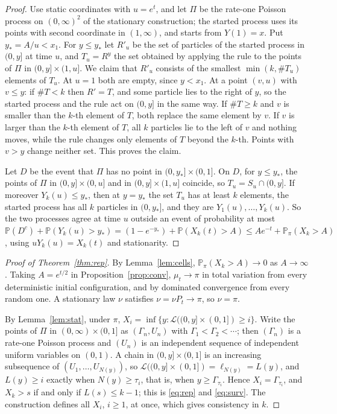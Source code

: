 \documentclass[11pt]{amsart}
\theoremstyle{remark}
\numberwithin{equation}{section}
\newcommand{\Pp}{\mathbb P}
\begin{document}
\begin{proof}
Use static coordinates with $u=e^t$, and let $\Pi$ be the rate-one Poisson process on $(0,\infty)^2$ of the stationary construction; the started process uses its points with second coordinate in $(1,\infty)$, and starts from $Y(1)=x$. Put $y_*=A/u<x_1$. For $y\le y_*$ let $R'_u$ be the set of particles of the started process in $(0,y]$ at time $u$, and $T_u=R^y$ the set obtained by applying the rule to the points of $\Pi$ in $(0,y]\times(1,u]$. We claim that $R'_u$ consists of the smallest $\min(k,\#T_u)$ elements of $T_u$. At $u=1$ both are empty, since $y<x_1$. At a point $(v,u)$ with $v\le y$: if $\#T<k$ then $R'=T$, and some particle lies to the right of $y$, so the started process and the rule act on $(0,y]$ in the same way. If $\#T\ge k$ and $v$ is smaller than the $k$-th element of $T$, both replace the same element by $v$. If $v$ is larger than the $k$-th element of $T$, all $k$ particles lie to the left of $v$ and nothing moves, while the rule changes only elements of $T$ beyond the $k$-th. Points with $v>y$ change neither set. This proves the claim.

Let $D$ be the event that $\Pi$ has no point in $(0,y_*]\times(0,1]$. On $D$, for $y\le y_*$, the points of $\Pi$ in $(0,y]\times(0,u]$ and in $(0,y]\times(1,u]$ coincide, so $T_u=S_u\cap(0,y]$. If moreover $Y_k(u)\le y_*$, then at $y=y_*$ the set $T_u$ has at least $k$ elements, the started process has all $k$ particles in $(0,y_*]$, and they are $Y_1(u),\dots,Y_k(u)$. So the two processes agree at time $u$ outside an event of probability at most $\Pp(D^c)+\Pp(Y_k(u)>y_*)=(1-e^{-y_*})+\Pp(X_k(t)>A)\le Ae^{-t}+\Pp_\pi(X_k>A)$, using $uY_k(u)=X_k(t)$ and stationarity.
\end{proof}

\begin{proof}[Proof of Theorem~\ref{thm:rep}]
By Lemma~\ref{lem:cells}, $\Pp_\pi(X_k>A)\to0$ as $A\to\infty$. Taking $A=e^{t/2}$ in Proposition~\ref{prop:conv}, $\mu_t\to\pi$ in total variation from every deterministic initial configuration, and by dominated convergence from every random one. A stationary law $\nu$ satisfies $\nu=\nu P_t\to\pi$, so $\nu=\pi$.

By Lemma~\ref{lem:stat}, under $\pi$, $X_i=\inf\{y:\mathcal L((0,y]\times(0,1])\ge i\}$. Write the points of $\Pi$ in $(0,\infty)\times(0,1]$ as $(\Gamma_n,U_n)$ with $\Gamma_1<\Gamma_2<\cdots$; then $(\Gamma_n)$ is a rate-one Poisson process and $(U_n)$ is an independent sequence of independent uniform variables on $(0,1)$. A chain in $(0,y]\times(0,1]$ is an increasing subsequence of $(U_1,\dots,U_{N(y)})$, so $\mathcal L((0,y]\times(0,1])=\ell_{N(y)}=L(y)$, and $L(y)\ge i$ exactly when $N(y)\ge\tau_i$, that is, when $y\ge\Gamma_{\tau_i}$. Hence $X_i=\Gamma_{\tau_i}$, and $X_k>s$ if and only if $L(s)\le k-1$; this is \eqref{eq:rep} and \eqref{eq:surv}. The construction defines all $X_i$, $i\ge1$, at once, which gives consistency in $k$.
\end{proof}
\end{document}
